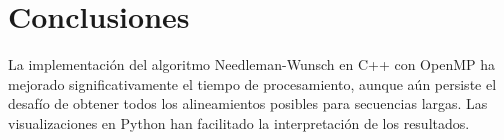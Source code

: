 \documentclass{article}
\begin{document}
\section{Conclusiones}
La implementación del algoritmo Needleman-Wunsch en C++ con OpenMP ha mejorado significativamente el tiempo de procesamiento, aunque aún persiste el desafío de obtener todos los alineamientos posibles para secuencias largas. Las visualizaciones en Python han facilitado la interpretación de los resultados.
\end{document}

